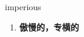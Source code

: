 
\begin{frame}
{\huge imperious}
\begin{center}
\begin{enumerate}\Large
  \item \textbf{傲慢的，专横的}
\end{enumerate}
\end{center}
\end{frame}
